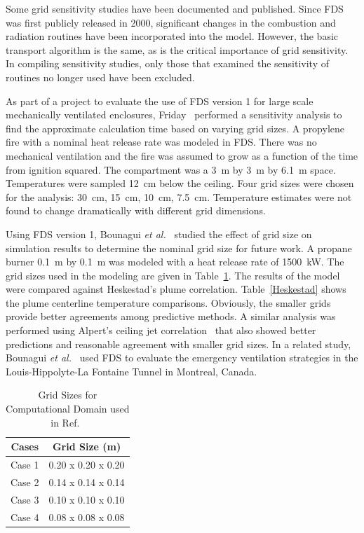 \documentclass[11pt]{book}
\begin{document}
Some   grid    sensitivity   studies   have    been   documented   and
published. Since FDS was  first publicly released in 2000, significant
changes   in  the   combustion  and   radiation  routines   have  been
incorporated into the model. However, the basic transport algorithm is
the  same, as  is  the  critical importance  of  grid sensitivity.  In
compiling   sensitivity  studies,   only  those   that   examined  the
sensitivity of routines no longer used have been excluded.

As part of  a project to evaluate  the use of FDS version  1 for large
scale   mechanically  ventilated   enclosures,  Friday~\cite{Friday:1}
performed a  sensitivity analysis to find  the approximate calculation
time based on varying grid sizes. A propylene fire with a nominal heat
release rate was  modeled in FDS. There was  no mechanical ventilation
and  the fire  was assumed  to grow  as a  function of  the  time from
ignition  squared.  The  compartment  was   a  3~m  by  3~m  by  6.1~m
space. Temperatures  were sampled 12~cm  below the ceiling.  Four grid
sizes   were   chosen  for   the   analysis:   30~cm,  15~cm,   10~cm,
7.5~cm. Temperature  estimates were  not found to  change dramatically
with different grid dimensions.

Using FDS  version 1, Bounagui {\em  et al.}~\cite{Bounagui:1} studied
the effect of grid size on simulation results to determine the nominal
grid size for future work. A propane burner 0.1~m by 0.1~m was modeled
with  a heat  release rate  of  1500~kW. The  grid sizes  used in  the
modeling are  given in Table~\ref{gridsize}. The results  of the model
were         compared         against        Heskestad's         plume
correlation.   Table~\ref{Heskestad}   shows   the  plume   centerline
temperature comparisons.  Obviously, the smaller  grids provide better
agreements among predictive methods.  A similar analysis was performed
using  Alpert's ceiling  jet correlation~\cite{SFPE:Alpert}  that also
showed better  predictions and reasonable agreement  with smaller grid
sizes.  In a  related study,  Bounagui {\em  et al.}~\cite{Bounagui:2}
used  FDS to  evaluate  the emergency  ventilation  strategies in  the
Louis-Hippolyte-La Fontaine Tunnel in Montreal, Canada.

\begin{table}[ht]
\begin{center}
\caption{Grid    Sizes    for    Computational    Domain    used    in
Ref.~\cite{Bounagui:1}} \label{gridsize} \vspace{0.1in}
\begin{tabular}{|c|c|}
\hline Cases&Grid Size (m)\\ \hline \hline Case 1&0.20 x 0.20 x 0.20\\
\hline Case 2&0.14 x 0.14 x  0.14\\ \hline Case 3&0.10 x 0.10 x 0.10\\
\hline Case 4&0.08 x 0.08 x 0.08\\ \hline
\end{tabular}
\end{center}
\end{table}
\end{document}
